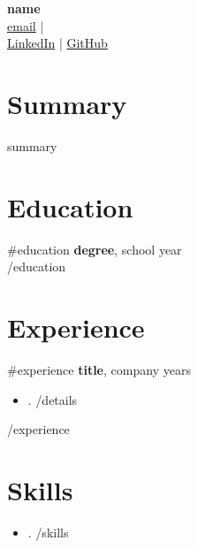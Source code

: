 \documentclass[11pt,a4paper]{article}
\begin{document}
\begin{center}
    {\Huge \textbf{{{name}}}}\\
    \vspace{4pt}
    \href{mailto:{{{email}}}}{{{email}}} \quad |  \\
    \href{{{linkedin}}}{LinkedIn} \quad | \quad \href{{{github}}}{GitHub}
\end{center}

\vspace{0.5cm}

\section*{Summary}
{{{summary}}}

\section*{Education}
{{#education}}
\textbf{{{degree}}}, {{{school}}} \hfill {{{year}}} \\
{{/education}}

\section*{Experience}
{{#experience}}
\textbf{{{title}}}, {{{company}}} \hfill {{{years}}} \\
\begin{itemize}
{{#details}}
  \item {{{.}}}
{{/details}}
\end{itemize}
{{/experience}}

\section*{Skills}
\begin{itemize}[label={--}]
{{#skills}}
  \item {{{.}}}
{{/skills}}
\end{itemize}
\end{document}
